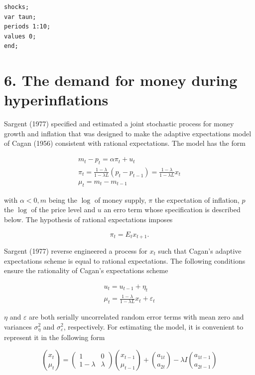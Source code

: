 \documentclass[10pt]{article}
\begin{document}
\begin{verbatim}
shocks;
var taun;
periods 1:10;
values 0;
end;
\end{verbatim}

\section*{6. The demand for money during hyperinflations}
Sargent (1977) specified and estimated a joint stochastic process for money growth and inflation that was designed to make the adaptive expectations model of Cagan (1956) consistent with rational expectations. The model has the form

\[
\begin{array}{r}
m_{t}-p_{t}=\alpha \pi_{t}+u_{t} \\
\pi_{t}=\frac{1-\lambda}{1-\lambda L}\left(p_{t}-p_{t-1}\right)=\frac{1-\lambda}{1-\lambda L} x_{t} \\
\mu_{t}=m_{t}-m_{t-1} \tag{27}
\end{array}
\]

with $\alpha<0, m$ being the $\log$ of money supply, $\pi$ the expectation of inflation, $p$ the $\log$ of the price level and $u$ an erro term whose specification is described below. The hypothesis of rational expectations imposes


\begin{equation*}
\pi_{t}=E_{t} x_{t+1} . \tag{28}
\end{equation*}


Sargent (1977) reverse engineered a process for $x_{t}$ such that Cagan's adaptive expectations scheme is equal to rational expectations. The following conditions ensure the rationality of Cagan's expectations scheme

\[
\begin{array}{r}
u_{t}=u_{t-1}+\eta_{t} \\
\mu_{t}=\frac{1-\lambda}{1-\lambda L} x_{t}+\varepsilon_{t} \tag{30}
\end{array}
\]

$\eta$ and $\varepsilon$ are both serially uncorrelated random error terms with mean zero and variances $\sigma_{\eta}^{2}$ and $\sigma_{\varepsilon}^{2}$, respectively. For estimating the model, it is convenient to represent it in the following form

\[
\binom{x_{t}}{\mu_{t}}=\left(\begin{array}{cc}
1 & 0  \tag{31}\\
1-\lambda & \lambda
\end{array}\right)\binom{x_{t-1}}{\mu_{t-1}}+\binom{a_{1 t}}{a_{2 t}}-\lambda I\binom{a_{1 t-1}}{a_{2 t-1}}
\]
\end{document}
